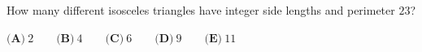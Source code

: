 How many different isosceles triangles have integer side lengths and perimeter $23$?

$\textbf{(A)}\ 2\qquad\textbf{(B)}\ 4\qquad\textbf{(C)}\ 6\qquad\textbf{(D)}\ 9\qquad\textbf{(E)}\ 11$
